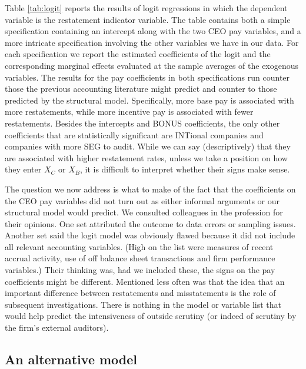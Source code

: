 Table \ref{tab:logit} reports the results of logit regressions in which the dependent
variable is the restatement indicator variable. 
The table contains both a simple 
specification containing an intercept along with the two CEO pay variables, 
and a more intricate specification involving the other variables we have in our data.
For each specification we report the estimated coefficients of the logit and the 
corresponding marginal effects evaluated at the sample averages of the exogenous
variables.%
The results for the pay coefficients in both specifications run counter those the previous accounting literature might predict and counter to those predicted by the structural model.
Specifically,  more base pay is associated with more restatements, while more incentive pay is associated with fewer restatements.
Besides the intercepts and BONUS coefficients, the only other coefficients  that are statistically significant are INTional companies and companies with more SEG to audit. 
While we can say (descriptively) that they are associated
with higher restatement rates, unless we take a position on how they enter $X_C$ or $X_B$, it is difficult to interpret whether their signs make sense.

The question we now address is what to make of the fact that the coefficients
on the CEO pay variables did not turn out as either informal arguments or our
structural model would predict. 
We consulted colleagues in the profession for their opinions. 
One set attributed the outcome to data errors or sampling issues. 
Another set said the logit model was obviously flawed because it did not include all relevant accounting variables. (High on the list were measures
of recent accrual activity, use of off balance sheet transactions and firm
performance variables.) 
Their thinking was, had we included these, the signs on the pay coefficients might be different. 
Mentioned less often was that the idea that an important difference between restatements and misstatements is the role of subsequent investigations. 
There is nothing in the model or variable list that would help predict  the intensiveness of outside scrutiny (or indeed of scrutiny by the firm's external auditors).

\subsection{An alternative model}


